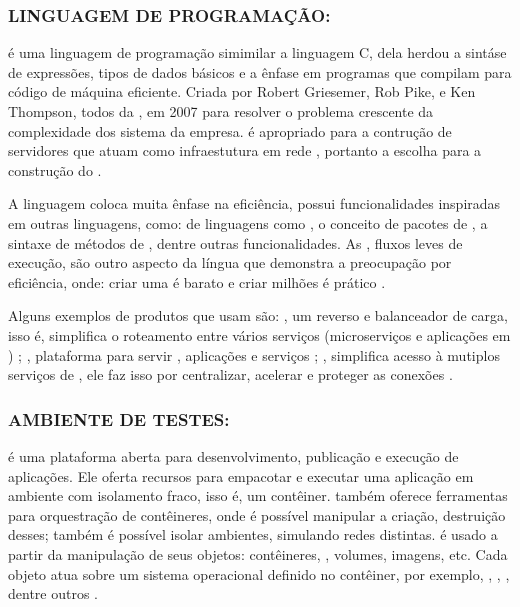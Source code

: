 \subsubsection{LINGUAGEM DE PROGRAMAÇÃO: }

 é uma linguagem de programação simimilar a linguagem C, dela herdou a sintáse de expressões, tipos de dados básicos e a ênfase em programas que compilam para código de máquina eficiente. Criada por Robert Griesemer, Rob Pike, e Ken Thompson, todos da , em 2007 para resolver o problema crescente da complexidade dos sistema da empresa.  é apropriado para a contrução de servidores que atuam como infraestutura em rede \cite{donovan2016gopl}, portanto a escolha para a construção do . 

A linguagem coloca muita ênfase na eficiência,  possui funcionalidades inspiradas em outras linguagens, como:  de linguagens como , o conceito de pacotes de , a sintaxe de métodos de , dentre outras funcionalidades. As , fluxos leves de execução, são outro aspecto da língua que demonstra a preocupação por eficiência, onde: criar uma  é barato e criar milhões é prático \cite{donovan2016gopl}. 

Alguns exemplos de produtos que usam  são: , um  reverso e balanceador de carga, isso é, simplifica o roteamento entre vários serviços (microserviços e aplicações em ) \cite{traefik_docs}; , plataforma para servir , aplicações e serviços \cite{caddy_docs}; , simplifica acesso à mutiplos serviços de , ele faz isso por centralizar, acelerar e proteger as conexões \cite{krakend_docs}.

\subsubsection{AMBIENTE DE TESTES: }

 é uma plataforma aberta para desenvolvimento, publicação e execução de aplicações. Ele oferta recursos para empacotar e executar uma aplicação em ambiente com isolamento fraco, isso é, um contêiner.  também oferece ferramentas para orquestração de contêineres, onde é possível manipular a criação, destruição desses; também é possível isolar ambientes, simulando redes distintas.  é usado a partir da manipulação de seus objetos: contêineres, , volumes, imagens, etc. Cada objeto atua sobre um sistema operacional definido no contêiner, por exemplo, , , , dentre outros \cite{DockerOverviewDocs}.

